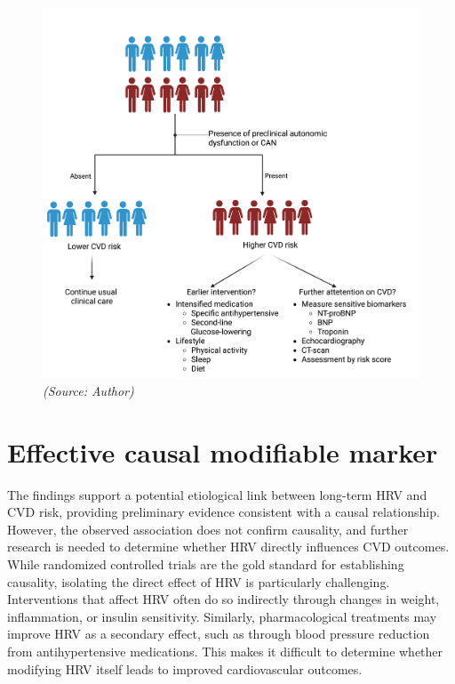 \documentclass[
  a4paper,
  headsepline=true,
  open=any]{scrbook}
\begin{document}
\begin{figure}

\begin{minipage}[t]{\linewidth}

{\centering 

\includegraphics[width=5in,height=\textheight]{images/strafication_tree_of_CAN(1).png}
\emph{(Source: Author)}

}

\end{minipage}%

\end{figure}

\hypertarget{effective-causal-modifiable-marker}{%
\section{Effective causal modifiable
marker}\label{effective-causal-modifiable-marker}}

The findings support a potential etiological link between long-term HRV
and CVD risk, providing preliminary evidence consistent with a causal
relationship. However, the observed association does not confirm
causality, and further research is needed to determine whether HRV
directly influences CVD outcomes. While randomized controlled trials are
the gold standard for establishing causality, isolating the direct
effect of HRV is particularly challenging. Interventions that affect HRV
often do so indirectly through changes in weight, inflammation, or
insulin sensitivity. Similarly, pharmacological treatments may improve
HRV as a secondary effect, such as through blood pressure reduction from
antihypertensive medications. This makes it difficult to determine
whether modifying HRV itself leads to improved cardiovascular outcomes.
\end{document}
